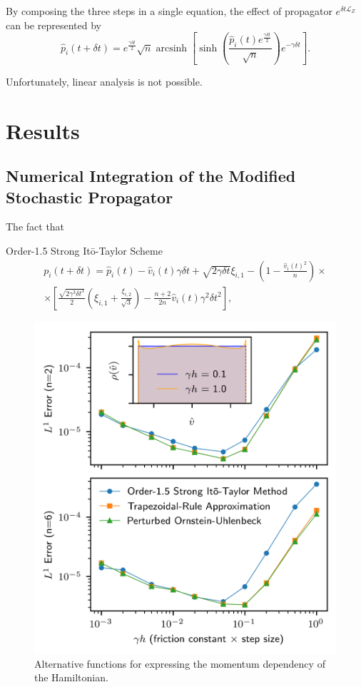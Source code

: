 \documentclass[
aip,
jcp,
reprint,
]{revtex4-1}
\DeclareMathOperator\arcsinh{arcsinh}
\begin{document}
By composing the three steps in a single equation, the effect of propagator $e^{\delta t \mathcal{L}_{Z}}$ can be represented by
\begin{equation*}
\hat{p}_i(t+\delta t) = e^{\frac{\gamma \delta t}{2}} \sqrt{n} \arcsinh\left[\sinh\left(\frac{\hat{p}_i(t) e^{\frac{\gamma \delta t}{2}}}{\sqrt{n}}\right) e^{-\gamma \delta t} \right].
\end{equation*}

Unfortunately, linear analysis is not possible.

\section{Results}

\subsection{Numerical Integration of the Modified Stochastic Propagator}

The fact that 

Order-1.5 Strong It\={o}-Taylor Scheme \cite{Kloeden_1992}
\begin{multline}
p_i(t+\delta t) = \hat{p}_i(t) - \hat{v}_i(t) \gamma \delta t + \sqrt{2 \gamma \delta t} \xi_{i,1} - \left(1 - \frac{\hat{v}_i(t)^2}{n}\right) \times \\
\times \left[ \frac{\sqrt{2 \gamma^3 \delta t^3}}{2}\left(\xi_{i,1} + \frac{\xi_{i,2}}{\sqrt{3}}\right) - \frac{n+2}{2 n} \hat{v}_i(t) \gamma^2 \delta t^2 \right],
\end{multline}

\begin{figure}
	\centering
	\includegraphics{stochastic_integration}
	\caption{Alternative functions for expressing the momentum dependency of the Hamiltonian.}
	\label{fig:stochastic integration}
\end{figure}
\end{document}
